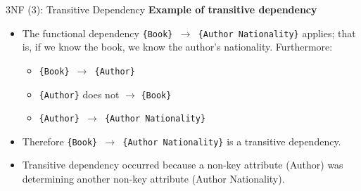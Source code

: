 \documentclass[aspectratio=169, xcolor=dvipsnames]{beamer}
\begin{document}
\begin{frame}{3NF (3): Transitive Dependency}
    \textbf{Example of transitive dependency}
    \begin{itemize}[<+->]
        \item The functional dependency \texttt{\{Book\} $\rightarrow$ \{Author Nationality\}} applies; that is, if we know the book, we know the author's nationality. Furthermore:
        \begin{itemize}
            \item[$\triangleright$] \texttt{\{Book\} $\rightarrow$ \{Author\}}
            \item[$\triangleright$] \texttt{\{Author\}} does not $\rightarrow$ \texttt{\{Book\}}
            \item[$\triangleright$] \texttt{\{Author\} $\rightarrow$ \{Author Nationality\}}
        \end{itemize}
        \item Therefore \texttt{\{Book\} $\rightarrow$ \{Author Nationality\}} is a transitive dependency.
        \item Transitive dependency occurred because a non-key attribute (Author) was determining another non-key attribute (Author Nationality).
    \end{itemize}
    \begin{table}
    \centering
    \end{table}
\end{frame}
\end{document}
